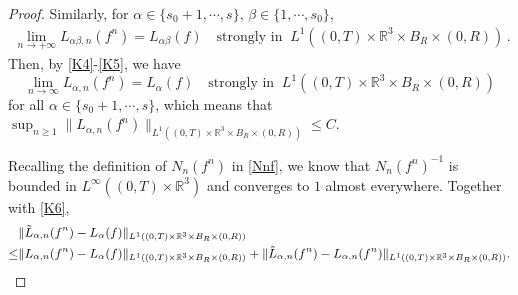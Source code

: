 \documentclass[reqno,11pt]{amsart}
\numberwithin{equation}{section}
\def\R{\mathbb{R}}
\begin{document}
\begin{proof}
Similarly, for $ \alpha \in \{ s_0 + 1, \cdots, s \} $, $\beta \in \{ 1, \cdots, s_0 \}$, 
\begin{equation}\label{K5}
  \begin{aligned}
    \lim_{n \to + \infty} L_{ \alpha \beta ,n} (f^n ) = L_{ \alpha \beta} (f) \quad \textrm{strongly in } \ L^1 ( (0, T) \times \R^3 \times B_R \times (0, R) ) \,.
  \end{aligned}
\end{equation}
Then, by \eqref{K4}-\eqref{K5}, we have
\begin{equation}\label{K6}
	\lim\limits_{n\rightarrow \infty } L_{\alpha ,n} (f^n) =L_{\alpha } (f) \quad \text{strongly in }\ L^1((0,T)\times \R^3 \times B_R\times (0,R))
\end{equation}
for all $\alpha \in \{s_0+1,\cdots,s\}$, which means that $ \sup_{n \geq 1} \| L_{\alpha ,n} (f^n) \|_{ L^1((0,T)\times \R^3 \times B_R\times (0,R)) } \leq C $. 

Recalling the definition of $N_n (f^n)$ in \eqref{Nnf}, we know that $N_n (f^n)^{-1}$ is bounded in $L^\infty ( (0,T) \times \R^3)$ and converges to $1$ almost everywhere. Together with \eqref{K6},
\begin{equation}\label{eq6.78}{\small
	\begin{aligned}
		& \Vert \tilde{L}_{\alpha ,n}(f^n) -L_\alpha (f) \Vert_{L^1((0,T)\times \R^3 \times B_R \times (0,R))} \\
		\leq & \Vert {L}_{\alpha ,n}(f^n) -L_\alpha (f) \Vert_{L^1((0,T)\times \R^3 \times B_R \times (0,R))} + \Vert \tilde{L}_{\alpha ,n}(f^n) - {L}_{\alpha ,n}(f^n) \Vert_{L^1((0,T)\times \R^3 \times B_R \times (0,R))}  .
	\end{aligned}}
\end{equation}



\end{proof}
\end{document}
